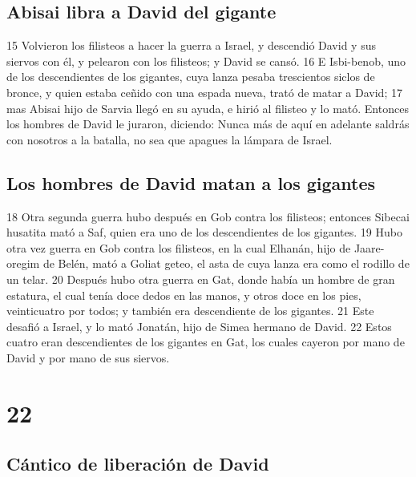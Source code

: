 \section*{Abisai libra a David del gigante}

15 Volvieron los filisteos a hacer la guerra a Israel, y descendió David y sus siervos con él, y pelearon con los filisteos; y David se cansó.
16 E Isbi-benob, uno de los descendientes de los gigantes, cuya lanza pesaba trescientos siclos de bronce,  y quien estaba ceñido con una espada nueva, trató de matar a David;
17 mas Abisai hijo de Sarvia llegó en su ayuda, e hirió al filisteo y lo mató. Entonces los hombres de David le juraron, diciendo: Nunca más de aquí en adelante saldrás con nosotros a la batalla, no sea que apagues la lámpara de Israel.
\section*{Los hombres de David matan a los gigantes}

 
18 Otra segunda guerra hubo después en Gob contra los filisteos; entonces Sibecai husatita mató a Saf, quien era uno de los descendientes de los gigantes.
19 Hubo otra vez guerra en Gob contra los filisteos, en la cual Elhanán, hijo de Jaare-oregim de Belén, mató a Goliat geteo, el asta de cuya lanza era como el rodillo de un telar.
20 Después hubo otra guerra en Gat, donde había un hombre de gran estatura, el cual tenía doce dedos en las manos, y otros doce en los pies, veinticuatro por todos; y también era descendiente de los gigantes.
21 Este desafió a Israel, y lo mató Jonatán, hijo de Simea hermano de David.
22 Estos cuatro eran descendientes de los gigantes en Gat, los cuales cayeron por mano de David y por mano de sus siervos.

\chapter{22}

\section*{Cántico de liberación de David}

 

